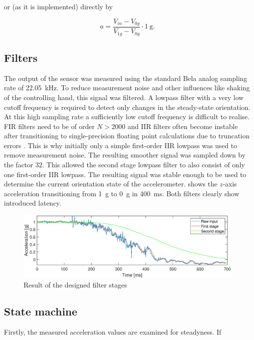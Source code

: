 \documentclass[a4paper, 12pt]{article}
\begin{document}
or (as it is implemented) directly by

\begin{equation}
	a = \frac{V_{in} - V_{0g}}{V_{1g} - V_{0g}} \cdot \SI{1}{\gram}.
\end{equation}

\subsection{Filters}
The output of the sensor was measured using the standard Bela analog sampling rate of \SI{22.05}{\kilo\hertz}. To reduce measurement noise and other influences like shaking of the controlling hand, this signal was filtered. A lowpass filter with a very low cutoff frequency is required to detect only changes in the steady-state orientation. At this high sampling rate a sufficiently low cutoff frequency is difficult to realise. FIR filters need to be of order $N>2000$ and IIR filters often become instable after transitioning to single-precision floating point calculations due to truncation errors \cite{Harris1998}. This is why initially only a simple first-order IIR lowpass was used to remove measurement noise. The resulting smoother signal was sampled down by the factor $32$. This allowed the second stage lowpass filter to also consist of only one first-order IIR lowpass. The resulting signal was stable enough to be used to determine the current orientation state of the accelerometer.  shows the $z$-axis acceleration transitioning from \SI{1}{\gram} to \SI{0}{\gram} in \SI{400}{\milli\second}. Both filters clearly show introduced latency.

\begin{figure}[h!]
	\centering
	\includegraphics[width=\textwidth]{filters.eps}
	\caption{Result of the designed filter stages}
	\label{fig:filtering}
\end{figure}

\subsection{State machine}
Firstly, the measured acceleration values are examined for steadyness. If 
\end{document}
